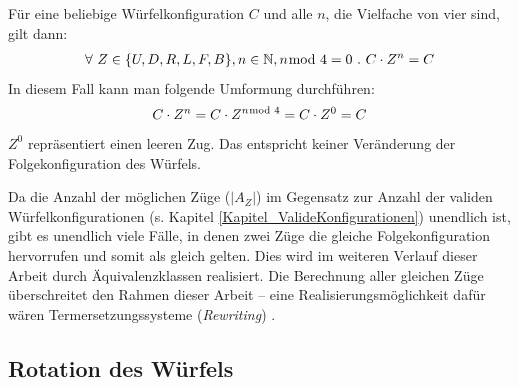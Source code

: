 \documentclass[12pt,a4paper, usenames, dvipsnames]{article}
\theoremstyle{mystyle}
\theoremstyle{definition}
\begin{document}
Für eine beliebige Würfelkonfiguration $C$ und alle $n$, die Vielfache von vier sind, gilt dann:
\begin{align*}
\forall \  Z \in \{U, D, R, L, F, B\}, n \in \mathbb{N}, n \hspace*{-0.6em} \mod 4 = 0 \ . \ 
C \cdot Z^n  
= C
\end{align*}
In diesem Fall kann man folgende Umformung durchführen:
\begin{align*}
C \cdot Z^n
= C \cdot Z^{n \hspace*{-0.5em} \mod 4} 
= C \cdot Z^0 
= C
\end{align*}
$Z^0$ repräsentiert einen leeren Zug. Das entspricht keiner Veränderung der Folgekonfiguration des Würfels.



Da die Anzahl der möglichen Züge ($|A_Z|$) im Gegensatz zur Anzahl der validen Würfel\-konfigurationen (s. Kapitel \ref{Kapitel_ValideKonfigurationen}) unendlich ist, gibt es unendlich viele Fälle, in denen zwei Züge die gleiche Folgekonfiguration hervorrufen und somit als gleich gelten. Dies wird im weiteren Verlauf dieser Arbeit durch Äquivalenzklassen realisiert. Die Berechnung aller gleichen Züge überschreitet den Rahmen dieser Arbeit -- eine Realisierungsmöglichkeit dafür wären Termersetzungssysteme (\textit{Rewriting}) \cite{RB}.


%
%
%
%
%
%
%
%
%
%

\subsection{Rotation des Würfels}

\label{Abschnitt_RotationDesWürfels}
\end{document}
